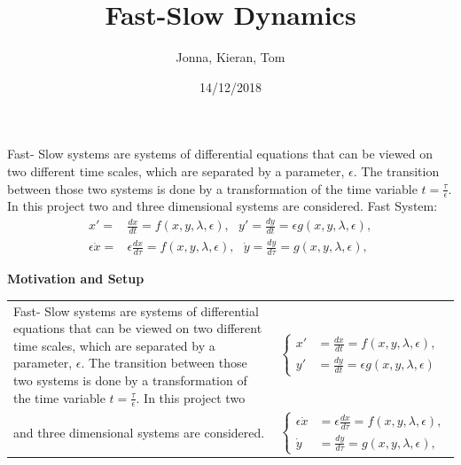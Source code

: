 \documentclass[15pt, a0paper, portrait]{tikzposter}
\title{Fast-Slow Dynamics}
\author{Jonna, Kieran, Tom }
\date{14/12/2018}
\begin{document}
 
\maketitle
 
\block{~}
{

Fast- Slow systems are systems of differential equations that can be viewed on two different time scales, which are separated by a parameter, $\epsilon$. The transition between those two systems is done by a transformation of the time variable $t = \frac{\tau}{\epsilon}$. 
In this project two and three dimensional systems are considered.
Fast System:
\begin{align*} 
x' =&\frac{dx}{dt}= f(x,y,\lambda, \epsilon), \ \ \
y' = \frac{dy}{dt}= \epsilon g( x,y, \lambda, \epsilon),
\\
\epsilon \dot{x} =& \epsilon \frac{dx}{d \tau} = f(x,y,\lambda, \epsilon),\ \ \
\dot{y} = \frac{dy}{d \tau} =  g( x,y, \lambda, \epsilon),
\end{align*}
}
\block{~}
{\textbf{Motivation and Setup}\\ \centering
    \begin{tabular}{p{0.7\linewidth}p{0.3\linewidth}}
    {Fast- Slow systems are systems of differential equations that can be viewed on two different time scales, which are separated by a parameter, $\epsilon$. The transition between those two systems is done by a transformation of the time variable $t = \frac{\tau}{\epsilon}$. 
In this project two }&{
    $
    \begin{cases}
   x' &= \frac{dx}{dt}= f(x,y,\lambda, \epsilon), \\
   y' &= \frac{dy}{dt}= \epsilon g( x,y, \lambda, \epsilon)
    \end{cases}\label{FastS}
    $}\\ 
{and three dimensional systems are considered.}&
{$    \begin{cases}
    \epsilon \dot{x} &= \epsilon \frac{dx}{d \tau} = f(x,y,\lambda, \epsilon),\\
    \dot{y} & = \frac{dy}{d \tau} =  g( x,y, \lambda, \epsilon),
    \end{cases}\label{SlowS}
    $ }
\end{tabular}
} 
\end{document}
